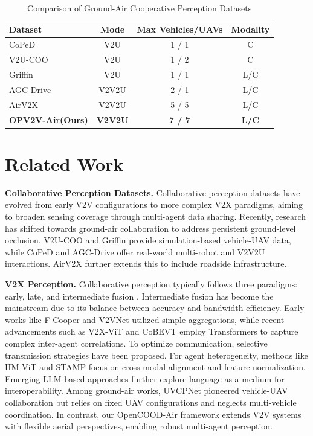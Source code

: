 \documentclass[conference]{IEEEtran}
\begin{document}
\begin{table}[t]
\centering
\caption{Comparison of Ground-Air Cooperative Perception Datasets}
\label{tab:comparison}
\renewcommand{\arraystretch}{1.2}
\begin{tabular*}{\columnwidth}{@{\extracolsep{\fill}}lccc@{}}
\toprule
Dataset & Mode & Max Vehicles/UAVs & Modality \\ \midrule
CoPeD \cite{zhou2024coped} & V2U & 1 / 1 & C \\
V2U-COO \cite{wang2025uvcpnet} & V2U & 1 / 2 & C \\
Griffin \cite{wang2025} & V2U & 1 / 1 & L/C \\
AGC-Drive \cite{hou2025} & V2V2U & 2 / 1 & L/C \\
AirV2X \cite{gao2025} & V2V2U & 5 / 5 & L/C \\
\textbf{OPV2V-Air(Ours)} & \textbf{V2V2U} & \textbf{7 / 7} & \textbf{L/C} \\ \bottomrule
\end{tabular*}
\end{table}
\section{Related Work}
\textbf{Collaborative Perception Datasets.}
Collaborative perception datasets have evolved from early V2V \cite{xu2022opv2v, xu2023v2v4real} configurations to more complex V2X \cite{yu2022dair, zimmer2024tumtraf, xiang2024v2x} paradigms, aiming to broaden sensing coverage through multi-agent data sharing. Recently, research has shifted towards ground-air collaboration to address persistent ground-level occlusion. V2U-COO \cite{wang2025uvcpnet} and Griffin \cite{wang2025} provide simulation-based vehicle-UAV data, while CoPeD \cite{zhou2024coped} and AGC-Drive \cite{hou2025} offer real-world multi-robot and V2V2U interactions. AirV2X \cite{gao2025} further extends this to include roadside infrastructure.

\textbf{V2X Perception.}
Collaborative perception typically follows three paradigms: early, late, and intermediate fusion \cite{8885377, 8569832, wang2020v2vnet}. Intermediate fusion has become the mainstream due to its balance between accuracy and bandwidth efficiency. Early works like F-Cooper \cite{chen2019f} and V2VNet \cite{wang2020v2vnet} utilized simple aggregations, while recent advancements such as V2X-ViT \cite{xu2022v2x} and CoBEVT \cite{xucobevt} employ Transformers to capture complex inter-agent correlations. To optimize communication, selective transmission strategies \cite{liu2020when2com, hu2022where2comm} have been proposed. For agent heterogeneity, methods like HM-ViT \cite{xiang2023hm} and STAMP \cite{gaostamp} focus on cross-modal alignment and feature normalization. Emerging LLM-based approaches \cite{gao2025langcoop, you2026v2x} further explore language as a medium for interoperability.
Among ground-air works, UVCPNet \cite{wang2025uvcpnet} pioneered vehicle-UAV collaboration but relies on fixed UAV configurations and neglects multi-vehicle coordination. In contrast, our OpenCOOD-Air framework extends V2V systems with flexible aerial perspectives, enabling robust multi-agent perception.
\end{document}
